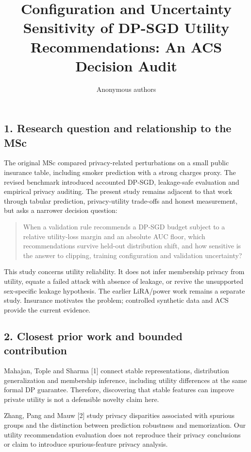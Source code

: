 \documentclass[
  10pt,
]{article}
\title{Configuration and Uncertainty Sensitivity of DP-SGD Utility Recommendations: An ACS Decision Audit}
\author{Anonymous authors}
\date{}
\begin{document}
\maketitle

\hypertarget{research-question-and-relationship-to-the-msc}{%
\subsection{1. Research question and relationship to the
MSc}\label{research-question-and-relationship-to-the-msc}}

The original MSc compared privacy-related perturbations on a small
public insurance table, including smoker prediction with a strong
charges proxy. The revised benchmark introduced accounted DP-SGD,
leakage-safe evaluation and empirical privacy auditing. The present
study remains adjacent to that work through tabular prediction,
privacy-utility trade-offs and honest measurement, but asks a narrower
decision question:

\begin{quote}
When a validation rule recommends a DP-SGD budget subject to a relative
utility-loss margin and an absolute AUC floor, which recommendations
survive held-out distribution shift, and how sensitive is the answer to
clipping, training configuration and validation uncertainty?
\end{quote}

This study concerns utility reliability. It does not infer membership
privacy from utility, equate a failed attack with absence of leakage, or
revive the unsupported sex-specific leakage hypothesis. The earlier
LiRA/power work remains a separate study. Insurance motivates the
problem; controlled synthetic data and ACS provide the current evidence.

\hypertarget{closest-prior-work-and-bounded-contribution}{%
\subsection{2. Closest prior work and bounded
contribution}\label{closest-prior-work-and-bounded-contribution}}

Mahajan, Tople and Sharma {[}1{]} connect stable representations,
distribution generalization and membership inference, including utility
differences at the same formal DP guarantee. Therefore, discovering that
stable features can improve private utility is not a defensible novelty
claim here.

Zhang, Pang and Mauw {[}2{]} study privacy disparities associated with
spurious groups and the distinction between prediction robustness and
memorization. Our utility recommendation evaluation does not reproduce
their privacy conclusions or claim to introduce spurious-feature privacy
analysis.
\end{document}
